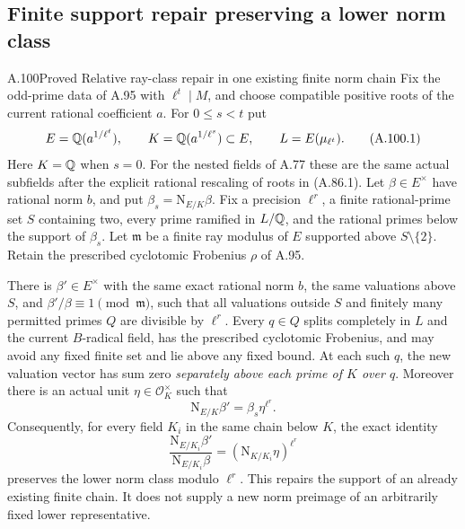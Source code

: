 \subsection{Finite support repair preserving a lower norm class}

\begin{statement}{A.100}{Proved}
{Relative ray-class repair in one existing finite norm chain}
Fix the odd-prime data of A.95 with $\ell^t\mid M$, and
choose compatible positive roots of the current rational
coefficient $a$.
For $0\le s<t$ put
\[
 E=\mathbb Q(a^{1/\ell^t}),\qquad
 K=\mathbb Q(a^{1/\ell^s})\subset E,\qquad
 L=E(\mu_{\ell^t}).
 \tag{A.100.1}
\]
Here $K=\mathbb Q$ when $s=0$.
For the nested fields of A.77 these are the same actual
subfields after the explicit rational rescaling of roots
in (A.86.1).
Let $\beta\in E^\times$ have rational norm $b$, and put
$\beta_s=\mathrm N_{E/K}\beta$.
Fix a precision $\ell^r$, a finite rational-prime set $S$
containing two, every prime ramified in $L/\mathbb Q$, and the
rational primes below the support of $\beta_s$.
Let $\mathfrak m$ be a finite ray modulus of $E$ supported
above $S\setminus\{2\}$.
Retain the prescribed cyclotomic Frobenius $\rho$ of A.95.

There is $\beta'\in E^\times$ with the same exact rational
norm $b$, the same valuations above $S$, and
$\beta'/\beta\equiv1\pmod{\mathfrak m}$, such that all
valuations outside $S$ and finitely many permitted primes
$Q$ are divisible by $\ell^r$.
Every $q\in Q$ splits completely in $L$ and the current
$B$-radical field, has the prescribed cyclotomic Frobenius,
and may avoid any fixed finite set and lie above any fixed bound.
At each such $q$, the new valuation vector has sum zero
\emph{separately above each prime of $K$ over $q$}.
Moreover there is an actual unit $\eta\in\mathcal O_K^\times$
such that
\[
                  \mathrm N_{E/K}\beta'
                                =\beta_s\eta^{\ell^r}.
 \tag{A.100.2}
\]
Consequently, for every field $K_i$ in the same chain
below $K$, the exact identity
\[
 \frac{\mathrm N_{E/K_i}\beta'}{\mathrm N_{E/K_i}\beta}
                           =(\mathrm N_{K/K_i}\eta)^{\ell^r}
 \tag{A.100.3}
\]
preserves the lower norm class modulo $\ell^r$.
This repairs the support of an already existing finite
chain.  It does not supply a new norm preimage of an
arbitrarily fixed lower representative.
\end{statement}
